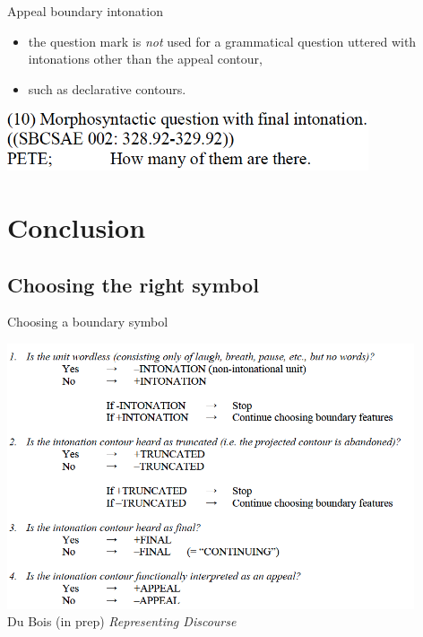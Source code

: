 \documentclass[compress,12pt]{beamer}%
\begin{document}
  \begin{frame}{Appeal boundary intonation}
    \begin{itemize}
      \item the question mark is \textit{not} used for a grammatical question uttered with intonations other than the appeal contour,
      \item such as declarative contours.
    \end{itemize}
    \hfill\includegraphics[width=0.8\textwidth]{images/Appeal_Ex10.png}\\
    \hfill{}
  \end{frame}
   
  
\section{Conclusion}
\subsection{Choosing the right symbol}
  \begin{frame}{Choosing a boundary symbol}
    \begin{center}
      \includegraphics[width=0.9\textwidth]{images/IU_Questions.png}
      \\
      \hfill {\color{bluish}\tiny Du Bois (in prep) \textit{Representing Discourse}}
    \end{center}
  \end{frame}
  
\end{document}
